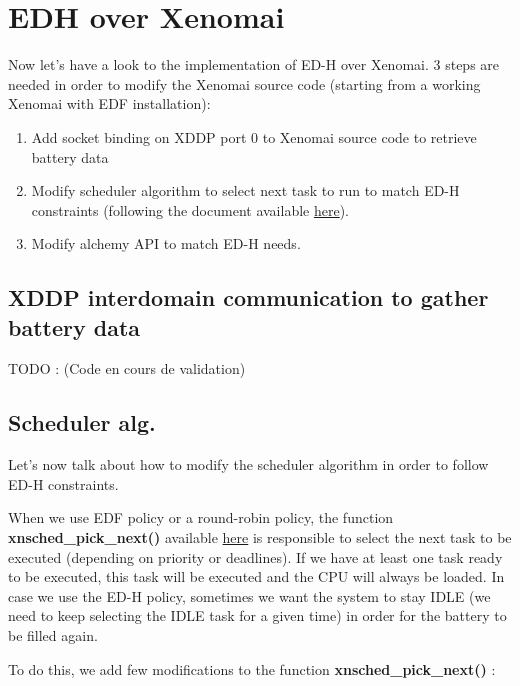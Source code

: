 \documentclass[12pt,hidelinks]{article}
\begin{document}
{%
\newpage
\section{EDH over Xenomai}
\vspace{4cm}
    
    Now let's have a look to the implementation of ED-H over Xenomai. 3 steps are needed in order to modify the Xenomai source code (starting from a working Xenomai with EDF installation):
    \begin{enumerate}
        \item Add socket binding on XDDP port 0 to Xenomai source code to retrieve battery data
        \item Modify scheduler algorithm to select next task to run to match ED-H constraints (following the document available \href{https://hal.archives-ouvertes.fr/hal-02058575}{here}). 
        \item Modify alchemy API to match ED-H needs.
        
    \end{enumerate}
	\subsection{XDDP interdomain communication to gather battery data}
	  TODO : (Code en cours de validation)\newline
	 
	\newpage \subsection{Scheduler alg.}
	Let's now talk about how to modify the scheduler algorithm in order to follow ED-H constraints.
	
	When we use EDF policy or a round-robin policy, the function \textbf{xnsched\_pick\_next()} available \href{https://github.com/skyultime/Xenomai-EDH/blob/final_version/kernel/cobalt/sched.c}{here} is responsible to select the next task to be executed (depending on priority or deadlines). If we have at least one task ready to be executed, this task will  be executed and the CPU will always be loaded. In case we use the ED-H policy, sometimes we want the system to stay IDLE (we need to keep selecting the IDLE task for a given time) in order for the battery to be filled again.\newline
	
	To do this, we add few modifications to the function \textbf{xnsched\_pick\_next()} :
	
}
\end{document}
